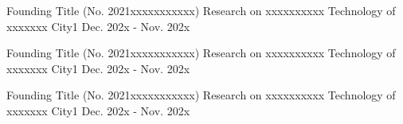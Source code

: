 
\begin{cventries}

  \cventry
    {Founding Title (No. 2021xxxxxxxxxxx)} %
    {Research on xxxxxxxxxx  Technology of xxxxxxx} %
    {City1} %
    {Dec. 202x - Nov. 202x} %
    { 
    }

 \vspace{-3.5mm} 


  \cventry
{Founding Title (No. 2021xxxxxxxxxxx)} %
{Research on xxxxxxxxxx  Technology of xxxxxxx} %
{City1} %
{Dec. 202x - Nov. 202x} %
{ 
}

 \vspace{-3.5mm} 
 
  \cventry
{Founding Title (No. 2021xxxxxxxxxxx)} %
{Research on xxxxxxxxxx  Technology of xxxxxxx} %
{City1} %
{Dec. 202x - Nov. 202x} %
{ 
}


 
 \vspace{-3.5mm} 

\end{cventries}
